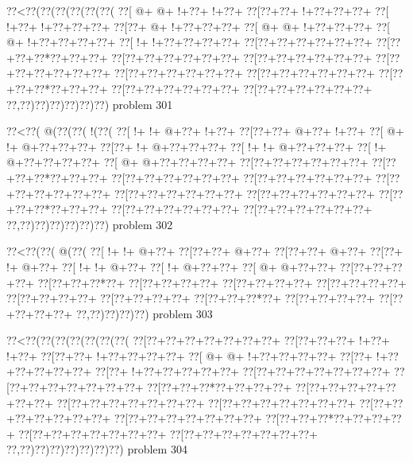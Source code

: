 \vbox{\vbox{\goo
\0??<\0??(\0??(\0??(\0??(\0??(\0??(
\0??[\- @+\- @+\- !+\0??+\- !+\0??+
\0??[\0??+\0??+\- !+\0??+\0??+\0??+
\0??[\- !+\0??+\- !+\0??+\0??+\0??+
\0??[\0??+\- @+\- !+\0??+\0??+\0??+
\0??[\- @+\- @+\- !+\0??+\0??+\0??+
\0??[\- @+\- !+\0??+\0??+\0??+\0??+
\0??[\- !+\- !+\0??+\0??+\0??+\0??+
\0??[\0??+\0??+\0??+\0??+\0??+\0??+
\0??[\0??+\0??+\0??*\0??+\0??+\0??+
\0??[\0??+\0??+\0??+\0??+\0??+\0??+
\0??[\0??+\0??+\0??+\0??+\0??+\0??+
\0??[\0??+\0??+\0??+\0??+\0??+\0??+
\0??[\0??+\0??+\0??+\0??+\0??+\0??+
\0??[\0??+\0??+\0??+\0??+\0??+\0??+
\0??[\0??+\0??+\0??*\0??+\0??+\0??+
\0??[\0??+\0??+\0??+\0??+\0??+\0??+
\0??[\0??+\0??+\0??+\0??+\0??+\0??+
\0??,\0??)\0??)\0??)\0??)\0??)\0??)
}
\hfil problem 301\hfil\break
}

\vbox{\vbox{\goo
\0??<\0??(\- @(\0??(\0??(\- !(\0??(
\0??[\- !+\- !+\- @+\0??+\- !+\0??+
\0??[\0??+\0??+\- @+\0??+\- !+\0??+
\0??[\- @+\- !+\- @+\0??+\0??+\0??+
\0??[\0??+\- !+\- @+\0??+\0??+\0??+
\0??[\- !+\- !+\- @+\0??+\0??+\0??+
\0??[\- !+\- @+\0??+\0??+\0??+\0??+
\0??[\- @+\- @+\0??+\0??+\0??+\0??+
\0??[\0??+\0??+\0??+\0??+\0??+\0??+
\0??[\0??+\0??+\0??*\0??+\0??+\0??+
\0??[\0??+\0??+\0??+\0??+\0??+\0??+
\0??[\0??+\0??+\0??+\0??+\0??+\0??+
\0??[\0??+\0??+\0??+\0??+\0??+\0??+
\0??[\0??+\0??+\0??+\0??+\0??+\0??+
\0??[\0??+\0??+\0??+\0??+\0??+\0??+
\0??[\0??+\0??+\0??*\0??+\0??+\0??+
\0??[\0??+\0??+\0??+\0??+\0??+\0??+
\0??[\0??+\0??+\0??+\0??+\0??+\0??+
\0??,\0??)\0??)\0??)\0??)\0??)\0??)
}
\hfil problem 302\hfil\break
}

\vbox{\vbox{\goo
\0??<\0??(\0??(\- @(\0??(
\0??[\- !+\- !+\- @+\0??+
\0??[\0??+\0??+\- @+\0??+
\0??[\0??+\0??+\- @+\0??+
\0??[\0??+\- !+\- @+\0??+
\0??[\- !+\- !+\- @+\0??+
\0??[\- !+\- @+\0??+\0??+
\0??[\- @+\- @+\0??+\0??+
\0??[\0??+\0??+\0??+\0??+
\0??[\0??+\0??+\0??*\0??+
\0??[\0??+\0??+\0??+\0??+
\0??[\0??+\0??+\0??+\0??+
\0??[\0??+\0??+\0??+\0??+
\0??[\0??+\0??+\0??+\0??+
\0??[\0??+\0??+\0??+\0??+
\0??[\0??+\0??+\0??*\0??+
\0??[\0??+\0??+\0??+\0??+
\0??[\0??+\0??+\0??+\0??+
\0??,\0??)\0??)\0??)\0??)
}
\hfil problem 303\hfil\break
}

\vbox{\vbox{\goo
\0??<\0??(\0??(\0??(\0??(\0??(\0??(\0??(
\0??[\0??+\0??+\0??+\0??+\0??+\0??+\0??+
\0??[\0??+\0??+\0??+\- !+\0??+\- !+\0??+
\0??[\0??+\0??+\- !+\0??+\0??+\0??+\0??+
\0??[\- @+\- @+\- !+\0??+\0??+\0??+\0??+
\0??[\0??+\- !+\0??+\0??+\0??+\0??+\0??+
\0??[\0??+\- !+\0??+\0??+\0??+\0??+\0??+
\0??[\0??+\0??+\0??+\0??+\0??+\0??+\0??+
\0??[\0??+\0??+\0??+\0??+\0??+\0??+\0??+
\0??[\0??+\0??+\0??*\0??+\0??+\0??+\0??+
\0??[\0??+\0??+\0??+\0??+\0??+\0??+\0??+
\0??[\0??+\0??+\0??+\0??+\0??+\0??+\0??+
\0??[\0??+\0??+\0??+\0??+\0??+\0??+\0??+
\0??[\0??+\0??+\0??+\0??+\0??+\0??+\0??+
\0??[\0??+\0??+\0??+\0??+\0??+\0??+\0??+
\0??[\0??+\0??+\0??*\0??+\0??+\0??+\0??+
\0??[\0??+\0??+\0??+\0??+\0??+\0??+\0??+
\0??[\0??+\0??+\0??+\0??+\0??+\0??+\0??+
\0??,\0??)\0??)\0??)\0??)\0??)\0??)\0??)
}
\hfil problem 304\hfil\break
}

